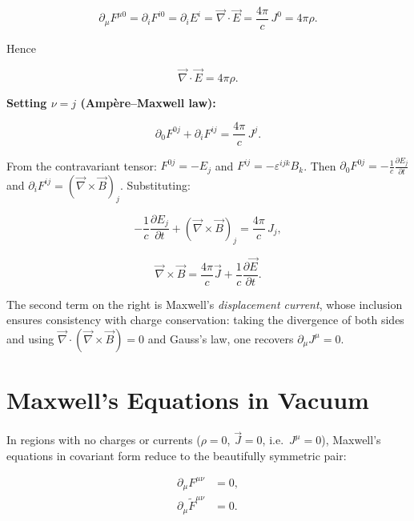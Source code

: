 \begin{equation}
\partial_\mu F^{\mu 0} = \partial_i F^{i0} = \partial_i E^i = \vec{\nabla}\cdot\vec{E} = \frac{4\pi}{c}\,J^0 = 4\pi\rho.
\end{equation}

Hence

\begin{equation}
\boxed{\vec{\nabla}\cdot\vec{E} = 4\pi\rho.}
\end{equation}

\textbf{Setting $\nu = j$ (Amp\`ere--Maxwell law):}

\begin{equation}
\partial_0 F^{0j} + \partial_i F^{ij} = \frac{4\pi}{c}\,J^j.
\end{equation}

From the contravariant tensor: $F^{0j} = -E_j$ and $F^{ij} = -\varepsilon^{ijk}B_k$. Then $\partial_0 F^{0j} = -\frac{1}{c}\frac{\partial E_j}{\partial t}$ and $\partial_i F^{ij} = (\vec{\nabla}\times\vec{B})_j$. Substituting:

\begin{equation}
-\frac{1}{c}\frac{\partial E_j}{\partial t} + (\vec{\nabla}\times\vec{B})_j = \frac{4\pi}{c}\,J_j,
\end{equation}

\begin{equation}
\boxed{\vec{\nabla}\times\vec{B} = \frac{4\pi}{c}\vec{J} + \frac{1}{c}\frac{\partial\vec{E}}{\partial t}.}
\end{equation}

The second term on the right is Maxwell's \emph{displacement current}, whose inclusion ensures consistency with charge conservation: taking the divergence of both sides and using $\vec{\nabla}\cdot(\vec{\nabla}\times\vec{B}) = 0$ and Gauss's law, one recovers $\partial_\mu J^\mu = 0$.

\section{Maxwell's Equations in Vacuum}

In regions with no charges or currents ($\rho = 0$, $\vec{J} = 0$, i.e.\ $J^\mu = 0$), Maxwell's equations in covariant form reduce to the beautifully symmetric pair:

\begin{align}
\partial_\mu F^{\mu\nu} &= 0, \label{eq:maxwell_vac_inhom}\\
\partial_\mu \widetilde{F}^{\mu\nu} &= 0. \label{eq:maxwell_vac_hom}
\end{align}

